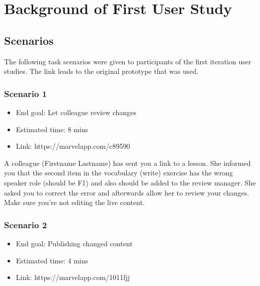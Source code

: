 \chapter{Background of First User Study} 
\label{sec:first-iteration-scenarios}



\section{Scenarios}
The following task scenarios were given to participants of the first iteration user studies. The link leads to the original prototype that was used.

\subsection{Scenario 1}
\begin{itemize}
  \item End goal: Let colleague review changes
  \item Estimated time: 8 mins
  \item Link: https://marvelapp.com/c89590
\end{itemize}

A colleague (Firstname Lastname) has sent you a link to a lesson.
She informed you that the second item in the vocabulary (write) exercise has the wrong speaker role (should be F1) and also should be added to the review manager. 
She asked you to correct the error and afterwards allow her to review your changes. 
Make sure you’re not editing the live content.

\subsection{Scenario 2}
\begin{itemize}
  \item End goal: Publishing changed content
  \item Estimated time: 4 mins
  \item Link: https://marvelapp.com/1011fjj
\end{itemize}


